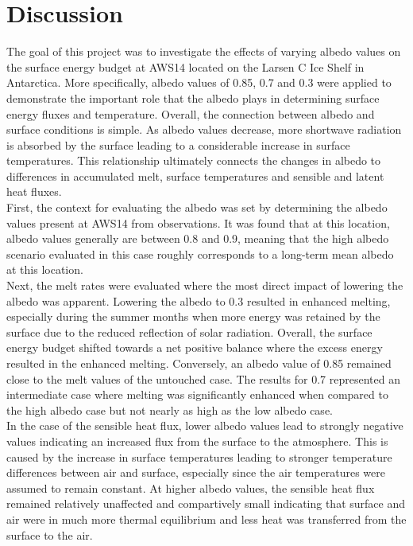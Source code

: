 \documentclass{article}
\begin{document}
\section*{Discussion}

The goal of this project was to investigate the effects of varying albedo values on the surface energy budget at AWS14 located on the Larsen C Ice Shelf in Antarctica.
More specifically, albedo values of 0.85, 0.7 and 0.3 were applied to demonstrate the important role that the albedo plays in determining surface energy fluxes and temperature. 
Overall, the connection between albedo and surface conditions is simple.
As albedo values decrease, more shortwave radiation is absorbed by the surface leading to a considerable increase in surface temperatures. 
This relationship ultimately connects the changes in albedo to differences in accumulated melt, surface temperatures and sensible and latent heat fluxes. \\
First, the context for evaluating the albedo was set by determining the albedo values present at AWS14 from observations. 
It was found that at this location, albedo values generally are between 0.8 and 0.9, meaning that the high albedo scenario evaluated in this case roughly corresponds to a long-term mean albedo at this location. \\
Next, the melt rates were evaluated where the most direct impact of lowering the albedo was apparent. 
Lowering the albedo to 0.3 resulted in enhanced melting, especially during the summer months when more energy was retained by the surface due to the reduced reflection of solar radiation. 
Overall, the surface energy budget shifted towards a net positive balance where the excess energy resulted in the enhanced melting. 
Conversely, an albedo value of 0.85 remained close to the melt values of the untouched case. 
The results for 0.7 represented an intermediate case where melting was significantly enhanced when compared to the high albedo case but not nearly as high as the low albedo case.\\
In the case of the sensible heat flux, lower albedo values lead to strongly negative values indicating an increased flux from the surface to the atmosphere. 
This is caused by the increase in surface temperatures leading to stronger temperature differences between air and surface, especially since the air temperatures were assumed to remain constant. 
At higher albedo values, the sensible heat flux remained relatively unaffected and compartively small indicating that surface and air were in much more thermal equilibrium and less heat was transferred from the surface to the air.\\
\end{document}
